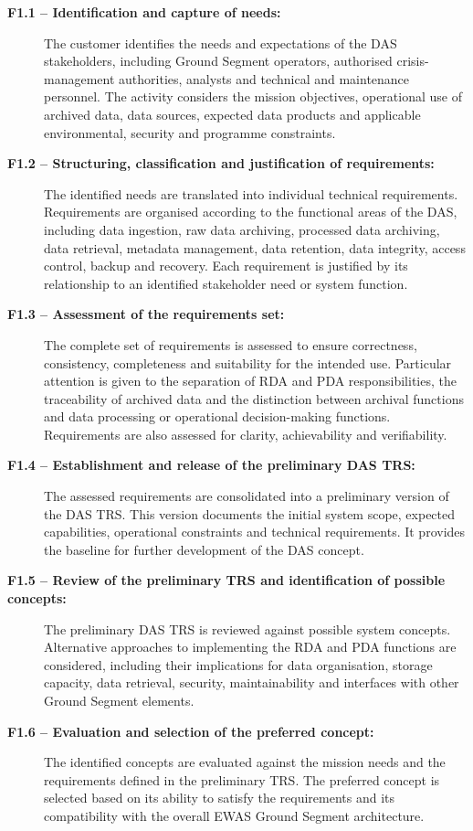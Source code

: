 \begin{description}
    \item[\textbf{F1.1 -- Identification and capture of needs:}] The customer identifies the needs and expectations of the DAS stakeholders, including Ground Segment operators, authorised crisis-management authorities, analysts and technical and maintenance personnel. The activity considers the mission objectives, operational use of archived data, data sources, expected data products and applicable environmental, security and programme constraints.
    \item[\textbf{F1.2 -- Structuring, classification and justification of requirements:}] The identified needs are translated into individual technical requirements. Requirements are organised according to the functional areas of the DAS, including data ingestion, raw data archiving, processed data archiving, data retrieval, metadata management, data retention, data integrity, access control, backup and recovery. Each requirement is justified by its relationship to an identified stakeholder need or system function.
    \item[\textbf{F1.3 -- Assessment of the requirements set:}] The complete set of requirements is assessed to ensure correctness, consistency, completeness and suitability for the intended use. Particular attention is given to the separation of RDA and PDA responsibilities, the traceability of archived data and the distinction between archival functions and data processing or operational decision-making functions. Requirements are also assessed for clarity, achievability and verifiability.
    \item[\textbf{F1.4 -- Establishment and release of the preliminary DAS TRS:}] The assessed requirements are consolidated into a preliminary version of the DAS TRS. This version documents the initial system scope, expected capabilities, operational constraints and technical requirements. It provides the baseline for further development of the DAS concept.
    \item[\textbf{F1.5 -- Review of the preliminary TRS and identification of possible concepts:}] The preliminary DAS TRS is reviewed against possible system concepts. Alternative approaches to implementing the RDA and PDA functions are considered, including their implications for data organisation, storage capacity, data retrieval, security, maintainability and interfaces with other Ground Segment elements.
    \item[\textbf{F1.6 -- Evaluation and selection of the preferred concept:}] The identified concepts are evaluated against the mission needs and the requirements defined in the preliminary TRS. The preferred concept is selected based on its ability to satisfy the requirements and its compatibility with the overall EWAS Ground Segment architecture.

\end{description}
